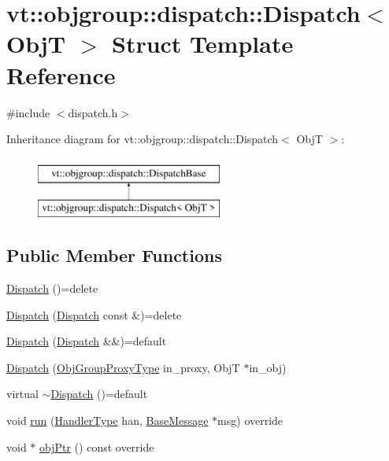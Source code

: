 \hypertarget{structvt_1_1objgroup_1_1dispatch_1_1_dispatch}{}\section{vt\+:\+:objgroup\+:\+:dispatch\+:\+:Dispatch$<$ ObjT $>$ Struct Template Reference}
\label{structvt_1_1objgroup_1_1dispatch_1_1_dispatch}


{\ttfamily \#include $<$dispatch.\+h$>$}

Inheritance diagram for vt\+:\+:objgroup\+:\+:dispatch\+:\+:Dispatch$<$ ObjT $>$\+:\begin{figure}[H]
\begin{center}
\leavevmode
\includegraphics[height=2.000000cm]{structvt_1_1objgroup_1_1dispatch_1_1_dispatch}
\end{center}
\end{figure}
\subsection*{Public Member Functions}
\begin{DoxyCompactItemize}
\item 
\hyperlink{structvt_1_1objgroup_1_1dispatch_1_1_dispatch_ae4fa82d799ff73006340737e2a4f2c13}{Dispatch} ()=delete
\item 
\hyperlink{structvt_1_1objgroup_1_1dispatch_1_1_dispatch_aa36763c5e026720041c4a405a593b9f3}{Dispatch} (\hyperlink{structvt_1_1objgroup_1_1dispatch_1_1_dispatch}{Dispatch} const \&)=delete
\item 
\hyperlink{structvt_1_1objgroup_1_1dispatch_1_1_dispatch_a8287e333b342d531f508a81281a164eb}{Dispatch} (\hyperlink{structvt_1_1objgroup_1_1dispatch_1_1_dispatch}{Dispatch} \&\&)=default
\item 
\hyperlink{structvt_1_1objgroup_1_1dispatch_1_1_dispatch_a61f23161c507dc49e91a12f1592a1e5e}{Dispatch} (\hyperlink{namespacevt_ad7cae989df485fccca57f0792a880a8e}{Obj\+Group\+Proxy\+Type} in\+\_\+proxy, ObjT $\ast$in\+\_\+obj)
\item 
virtual \hyperlink{structvt_1_1objgroup_1_1dispatch_1_1_dispatch_af0c5622152b327cd5a5fb781b6062e42}{$\sim$\+Dispatch} ()=default
\item 
void \hyperlink{structvt_1_1objgroup_1_1dispatch_1_1_dispatch_a9e6b35e9ff07fcc30c69b37fed60f770}{run} (\hyperlink{namespacevt_af64846b57dfcaf104da3ef6967917573}{Handler\+Type} han, \hyperlink{namespacevt_ac34f95a5e2b8109b55bfba52b074443d}{Base\+Message} $\ast$msg) override
\item 
void $\ast$ \hyperlink{structvt_1_1objgroup_1_1dispatch_1_1_dispatch_aea2f9957c5f4b07413a205d34bcfbd5c}{obj\+Ptr} () const override
\end{DoxyCompactItemize}


